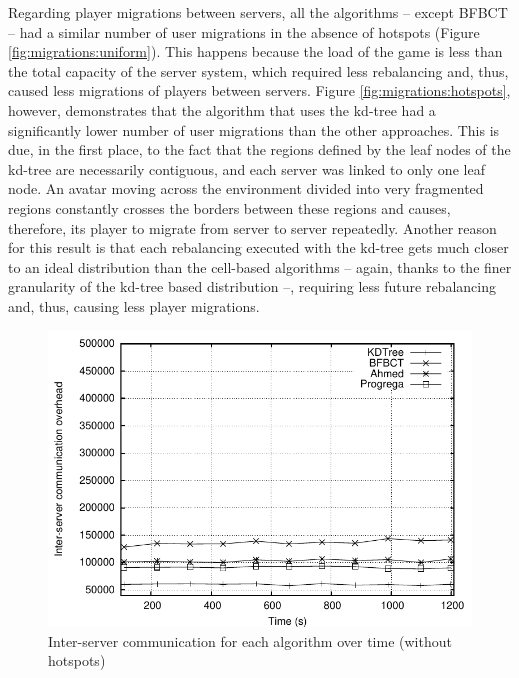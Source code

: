 \documentclass[acmtocl]{acmtrans2m}
\begin{document}
Regarding player migrations between servers, all the algorithms -- except BFBCT -- had a similar number of user migrations in the absence of hotspots (Figure \ref{fig:migrations:uniform}). This happens because the load of the game is less than the total capacity of the server system, which required less rebalancing and, thus, caused less migrations of players between servers. Figure \ref{fig:migrations:hotspots}, however, demonstrates that the algorithm that uses the kd-tree had a significantly lower number of user migrations than the other approaches. This is due, in the first place, to the fact that the regions defined by the leaf nodes of the kd-tree are necessarily contiguous, and each server was linked to only one leaf node. An avatar moving across the environment divided into very fragmented regions constantly crosses the borders between these regions and causes, therefore, its player to migrate from server to server repeatedly. Another reason for this result is that each rebalancing executed with the kd-tree gets much closer to an ideal distribution than the cell-based algorithms -- again, thanks to the finer granularity of the kd-tree based distribution --, requiring less future rebalancing and, thus, causing less player migrations.

\begin{figure}[!t]
	\centering
	\includegraphics[width=\linewidth]{images/overhead_uniform}
	\caption{Inter-server communication for each algorithm over time (without hotspots)}
	\label{fig:overhead:uniform}
\end{figure}
\end{document}

